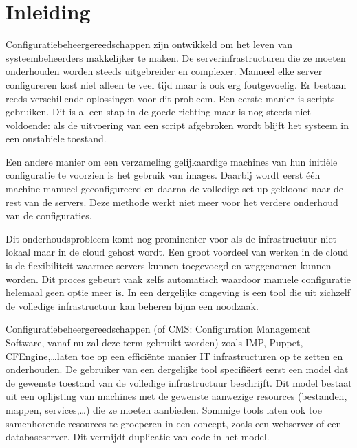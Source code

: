 \chapter{Inleiding}
\label{inleiding}
Configuratiebeheergereedschappen zijn ontwikkeld om het leven van systeembeheerders makkelijker te maken.
De serverinfrastructuren die ze moeten onderhouden worden steeds uitgebreider en complexer.
Manueel elke server configureren kost niet alleen te veel tijd maar is ook erg foutgevoelig.
Er bestaan reeds verschillende oplossingen voor dit probleem.
Een eerste manier is scripts gebruiken.
Dit is al een stap in de goede richting maar is nog steeds niet voldoende: 
als de uitvoering van een script afgebroken wordt blijft het systeem in een onstabiele toestand.\cite{sysadvent}

Een andere manier om een verzameling gelijkaardige machines van hun initi\"ele configuratie te voorzien is het gebruik van images.
Daarbij wordt eerst \'e\'en machine manueel geconfigureerd en daarna de volledige set-up gekloond naar de rest van de servers.
Deze methode werkt niet meer voor het verdere onderhoud van de configuraties.

Dit onderhoudsprobleem komt nog prominenter voor als de infrastructuur niet lokaal maar in de cloud gehost wordt.
Een groot voordeel van werken in de cloud is de flexibiliteit waarmee servers kunnen toegevoegd en weggenomen kunnen worden.
Dit proces gebeurt vaak zelfs automatisch waardoor manuele configuratie helemaal geen optie meer is. 
In een dergelijke omgeving is een tool die uit zichzelf de volledige infrastructuur kan beheren bijna een noodzaak.

Configuratiebeheergereedschappen (of CMS: Configuration Management Software, vanaf nu zal deze term gebruikt worden) zoals IMP\cite{IMP}, Puppet\cite{puppet}, CFEngine\cite{cfengine},\ldots laten toe op een effici\"ente manier IT infrastructuren op te zetten en onderhouden.
De gebruiker van een dergelijke tool specifi\"eert eerst een model dat de gewenste toestand van de volledige infrastructuur beschrijft.
Dit model bestaat uit een oplijsting van machines met de gewenste aanwezige resources (bestanden, mappen, services,\ldots) die ze moeten aanbieden.
Sommige tools laten ook toe samenhorende resources te groeperen in een concept, zoals een webserver of een databaseserver.
Dit vermijdt duplicatie van code in het model.

